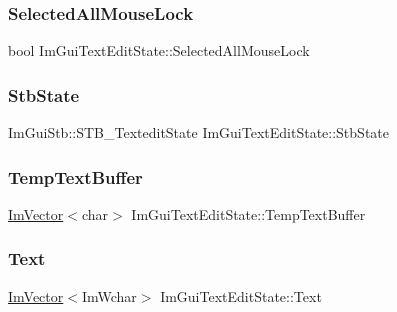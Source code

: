 \hypertarget{struct_im_gui_text_edit_state_adee23632ed1703c731651b163c1f481c}{}\label{struct_im_gui_text_edit_state_adee23632ed1703c731651b163c1f481c} 
\subsubsection{\texorpdfstring{Selected\+All\+Mouse\+Lock}{SelectedAllMouseLock}}
{\footnotesize\ttfamily bool Im\+Gui\+Text\+Edit\+State\+::\+Selected\+All\+Mouse\+Lock}

\hypertarget{struct_im_gui_text_edit_state_a0fb9de6739de31f44ecffce8ad239a5e}{}\label{struct_im_gui_text_edit_state_a0fb9de6739de31f44ecffce8ad239a5e} 
\subsubsection{\texorpdfstring{Stb\+State}{StbState}}
{\footnotesize\ttfamily Im\+Gui\+Stb\+::\+S\+T\+B\+\_\+\+Textedit\+State Im\+Gui\+Text\+Edit\+State\+::\+Stb\+State}

\hypertarget{struct_im_gui_text_edit_state_a299fd7f0af7c81eae119d304bd0beaca}{}\label{struct_im_gui_text_edit_state_a299fd7f0af7c81eae119d304bd0beaca} 
\subsubsection{\texorpdfstring{Temp\+Text\+Buffer}{TempTextBuffer}}
{\footnotesize\ttfamily \hyperlink{class_im_vector}{Im\+Vector}$<$char$>$ Im\+Gui\+Text\+Edit\+State\+::\+Temp\+Text\+Buffer}

\hypertarget{struct_im_gui_text_edit_state_a5c387aca48db34089a3c0ff251ff06fc}{}\label{struct_im_gui_text_edit_state_a5c387aca48db34089a3c0ff251ff06fc} 
\subsubsection{\texorpdfstring{Text}{Text}}
{\footnotesize\ttfamily \hyperlink{class_im_vector}{Im\+Vector}$<$Im\+Wchar$>$ Im\+Gui\+Text\+Edit\+State\+::\+Text}

